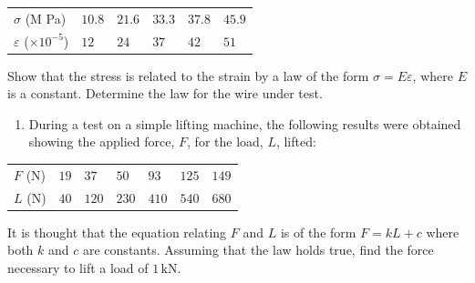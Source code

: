 \documentclass[
  12pt,
  oneside]{book}
\providecommand{\tightlist}{%
  \setlength{\itemsep}{0pt}\setlength{\parskip}{0pt}}
\theoremstyle{definition}
\theoremstyle{definition}
\theoremstyle{definition}
\theoremstyle{definition}
\theoremstyle{remark}
\begin{document}
\begin{longtable}[]{@{}
  >{\raggedright\arraybackslash}p{}
  >{\raggedright\arraybackslash}p{}
  >{\raggedright\arraybackslash}p{}
  >{\raggedright\arraybackslash}p{}
  >{\raggedright\arraybackslash}p{}
  >{\raggedright\arraybackslash}p{}@{}}
\toprule
\endhead
\(\sigma\) (M Pa) & \(10.8\) & \(21.6\) & \(33.3\) & \(37.8\) & \(45.9\) \\
\(\varepsilon\) (\(\times 10^{-5}\)) & \(12\) & \(24\) & \(37\) & \(42\) & \(51\) \\
\bottomrule
\end{longtable}

Show that the stress is related to the strain by a law of the form \(\sigma=E\varepsilon\), where \(E\) is a constant.
Determine the law for the wire under test.

\begin{enumerate}
\def\labelenumi{\arabic{enumi}.}
\setcounter{enumi}{1}
\tightlist
\item
  During a test on a simple lifting machine, the following results were obtained showing the
  applied force, \(F\), for the load, \(L\), lifted:
\end{enumerate}

\begin{longtable}[]{@{}
  >{\raggedright\arraybackslash}p{}
  >{\raggedright\arraybackslash}p{}
  >{\raggedright\arraybackslash}p{}
  >{\raggedright\arraybackslash}p{}
  >{\raggedright\arraybackslash}p{}
  >{\raggedright\arraybackslash}p{}
  >{\raggedright\arraybackslash}p{}@{}}
\toprule
\endhead
\(F\) (N) & \(19\) & \(37\) & \(50\) & \(93\) & \(125\) & \(149\) \\
\(L\) (N) & \(40\) & \(120\) & \(230\) & \(410\) & \(540\) & \(680\) \\
\bottomrule
\end{longtable}

It is thought that the equation relating \(F\) and \(L\) is of the form \(F = kL + c\) where both \(k\) and \(c\) are constants. Assuming that the law holds true, find the force necessary to lift a load of \(1\,\mathrm{kN}\).
\end{document}
